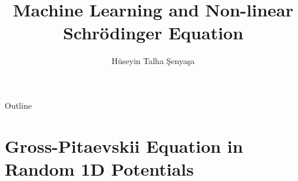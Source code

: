 \documentclass{beamer}
\title[Machine Learning and NLSE]{Machine Learning and Non-linear Schrödinger Equation}
\author{Hüseyin Talha Şenyaşa}
\institute{Graduation Project}
\begin{document}
\begin{frame}
  \titlepage
\end{frame}

\begin{frame}{Outline}
  \tableofcontents
\end{frame}

\section{Gross-Pitaevskii Equation in Random 1D Potentials}

%
%
%
%
%
%
%    
\end{document}

